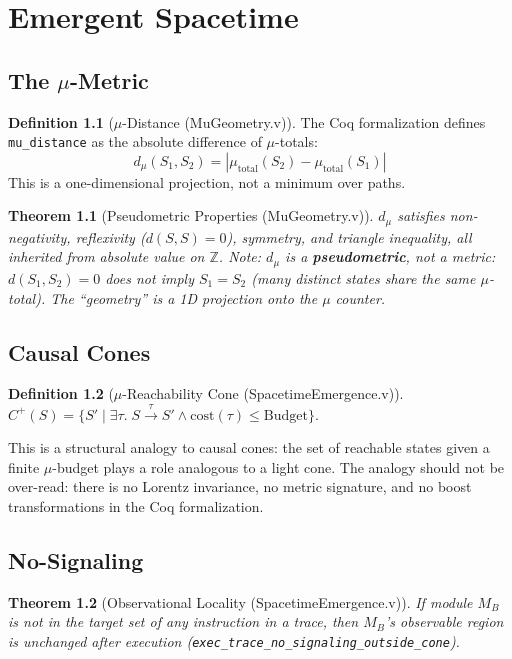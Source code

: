 \documentclass[11pt, a4paper]{report}
\theoremstyle{definition}
\newtheorem{definition}{Definition}[chapter]
\theoremstyle{plain}
\newtheorem{theorem}{Theorem}[chapter]
\begin{document}
\chapter{Emergent Spacetime}

\section{The $\mu$-Metric}

\begin{definition}[$\mu$-Distance {\normalfont (MuGeometry.v)}]
The Coq formalization defines \texttt{mu\_distance} as the absolute difference of $\mu$-totals:
\[ d_\mu(S_1, S_2) = |\mu_{\mathrm{total}}(S_2) - \mu_{\mathrm{total}}(S_1)| \]
This is a one-dimensional projection, not a minimum over paths.
\end{definition}

\begin{theorem}[Pseudometric Properties {\normalfont (MuGeometry.v)}]
$d_\mu$ satisfies non-negativity, reflexivity ($d(S,S)=0$), symmetry, and triangle inequality, all inherited from absolute value on $\mathbb{Z}$. Note: $d_\mu$ is a \textbf{pseudometric}, not a metric: $d(S_1,S_2)=0$ does \emph{not} imply $S_1=S_2$ (many distinct states share the same $\mu$-total). The ``geometry'' is a 1D projection onto the $\mu$ counter.
\end{theorem}

\section{Causal Cones}

\begin{definition}[$\mu$-Reachability Cone {\normalfont (SpacetimeEmergence.v)}]
$C^+(S) = \{ S' \mid \exists \tau.\; S \xrightarrow{\tau} S' \wedge \mathrm{cost}(\tau) \le \mathrm{Budget} \}$.
\end{definition}

This is a structural analogy to causal cones: the set of reachable states given a finite $\mu$-budget plays a role analogous to a light cone. The analogy should not be over-read: there is no Lorentz invariance, no metric signature, and no boost transformations in the Coq formalization.

\section{No-Signaling}

\begin{theorem}[Observational Locality {\normalfont (SpacetimeEmergence.v)}]
If module $M_B$ is not in the target set of any instruction in a trace, then $M_B$'s observable region is unchanged after execution (\texttt{exec\_trace\_no\_signaling\_outside\_cone}).
\end{theorem}
\end{document}
